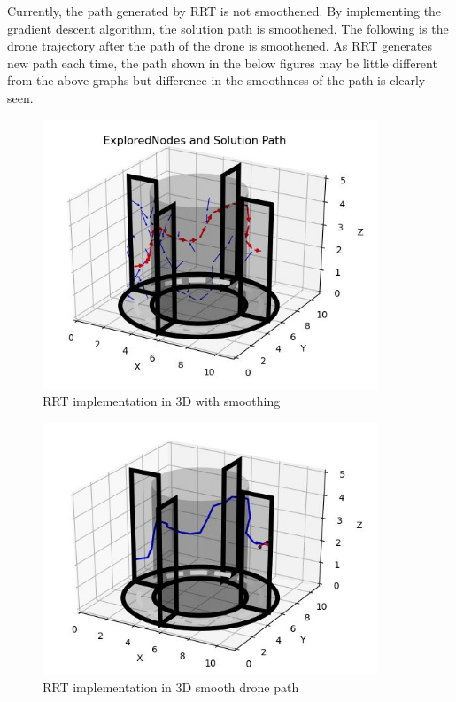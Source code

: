 \documentclass{IEEEtran}
\begin{document}
\newline 
Currently, the path generated by RRT is not smoothened. By implementing the gradient descent algorithm, the solution path is smoothened. The following is the drone trajectory after the path of the drone is smoothened. As RRT generates new path each time, the path shown in the below figures may be little different from the above graphs but difference in the smoothness of the path is clearly seen.
\newpage
\begin{figure}[h]
    \centering
    \includegraphics[width=10cm]{rrt3dsmooth}
    \caption{RRT implementation in 3D with smoothing}
    \label{fig:RRT implementation in 3D with smoothing}
\end{figure}
\begin{figure}[h]
    \centering
    \includegraphics[width=10cm]{rrt3dsmoothdrone}
    \caption{RRT implementation in 3D smooth drone path}
    \label{fig:RRT implementation in 3D smooth drone path}
\end{figure}
\end{document}
